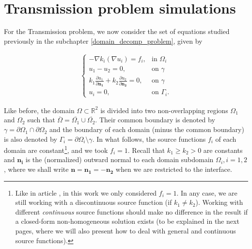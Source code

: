 

\section{Transmission problem simulations}\label{numerical_transmission_simulations}

For the Transmission problem, we now consider the set of equations studied previously in the subchapter \ref{domain_decomp_problem}, given by

\begin{align}\label{transmission_num}
    \begin{cases}
    - \nabla k_i \left(\nabla u_i\right) = f_i, & \text{in }\Omega_i\\
    u_1 - u_2 = 0, & \text{on }\gamma\\
    k_1 \frac{\partial u_1}{\partial \mathbf{n_1}} + k_2 \frac{\partial u_2}{\partial  \mathbf{n_2}} = 0, & \text{on }\gamma\\
    u_i = 0, & \text{on }\Gamma_i.
    \end{cases}
\end{align}

Like before, the domain \(\Omega \subset \mathbb{R}^2\) is divided into two non-overlapping regions \(\Omega_1\) and \(\Omega_2\) such that \(\overline{\Omega} = \overline{\Omega_1} \cup \overline{\Omega_2}\). Their common boundary is denoted by \(\gamma = \partial\Omega_1 \cap \partial\Omega_2\) and the boundary of each domain (minus the common boundary) is also denoted by \(\Gamma_i = \partial\Omega_i\setminus{\gamma}\). In what follows, the source functions \(f_i\) of each domain are constant\footnote{Like in article \cite{gustafsson2019error}, in this work we only considered \(f_i=1\). In any case, we are still working with a discontinuous source function (if \(k_1 \neq k_2\)). Working with different \textit{continuous} source functions should make no difference in the result if a closed-form non-homogeneous solution exists (to be explained in the next pages, where we will also present how to deal with general and continuous source functions).}, and we took \(f_i = 1\). Recall that \(k_1 \geq k_2 > 0\) are constants and \(\mathbf{n_i}\) is the (normalized) outward normal to each domain subdomain \(\Omega_i, i=1, 2\), where we shall write \(\mathbf{n}= \mathbf{n_1}=- \mathbf{n_2}\) when we are restricted to the interface.

